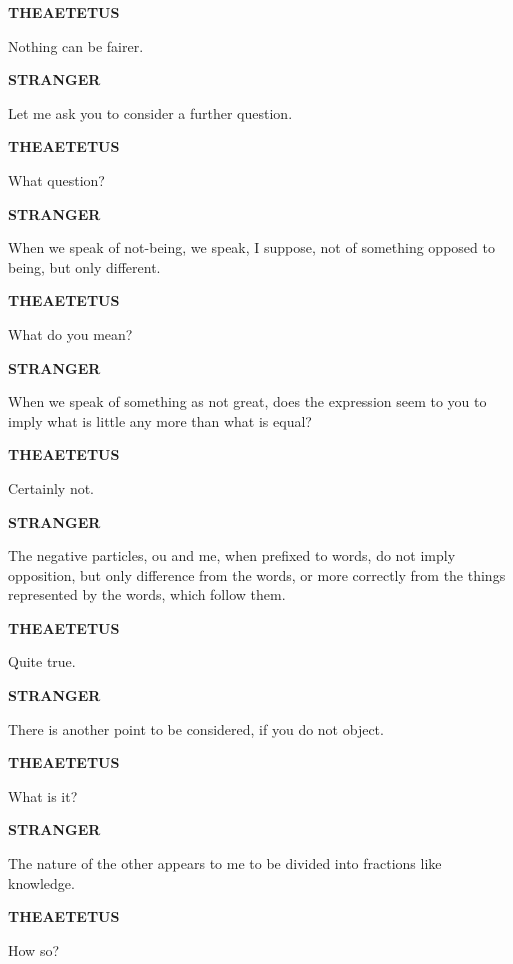 \documentclass[11pt,letter]{article}
\begin{document}
\par \textbf{THEAETETUS}
\par   Nothing can be fairer.

\par \textbf{STRANGER}
\par   Let me ask you to consider a further question.

\par \textbf{THEAETETUS}
\par   What question?

\par \textbf{STRANGER}
\par   When we speak of not-being, we speak, I suppose, not of something opposed to being, but only different.

\par \textbf{THEAETETUS}
\par   What do you mean?

\par \textbf{STRANGER}
\par   When we speak of something as not great, does the expression seem to you to imply what is little any more than what is equal?

\par \textbf{THEAETETUS}
\par   Certainly not.

\par \textbf{STRANGER}
\par   The negative particles, ou and me, when prefixed to words, do not imply opposition, but only difference from the words, or more correctly from the things represented by the words, which follow them.

\par \textbf{THEAETETUS}
\par   Quite true.

\par \textbf{STRANGER}
\par   There is another point to be considered, if you do not object.

\par \textbf{THEAETETUS}
\par   What is it?

\par \textbf{STRANGER}
\par   The nature of the other appears to me to be divided into fractions like knowledge.

\par \textbf{THEAETETUS}
\par   How so?
\end{document}
